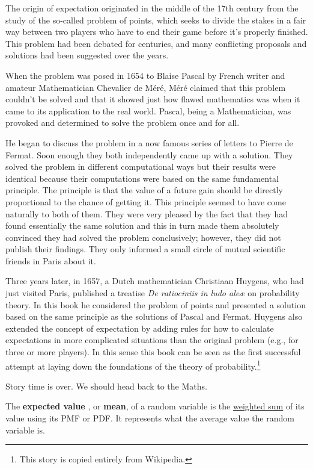 \documentclass[11pt, a4paper, oneside]{book}
\theoremstyle{definition}
\begin{document}
\noindent The origin of expectation originated in the middle of the 17th century from the study of the so-called problem of points, which seeks to divide the stakes in a fair way between two players who have to end their game before it's properly finished. This problem had been debated for centuries, and many conflicting proposals and solutions had been suggested over the years.

\noindent When the problem was posed in 1654 to Blaise Pascal by French writer and amateur Mathematician Chevalier de Méré, Méré claimed that this problem couldn't be solved and that it showed just how flawed mathematics was when it came to its application to the real world. Pascal, being a Mathematician, was provoked and determined to solve the problem once and for all. 

\noindent He began to discuss the problem in a now famous series of letters to Pierre de Fermat. Soon enough they both independently came up with a solution. They solved the problem in different computational ways but their results were identical because their computations were based on the same fundamental principle. The principle is that the value of a future gain should be directly proportional to the chance of getting it. This principle seemed to have come naturally to both of them. They were very pleased by the fact that they had found essentially the same solution and this in turn made them absolutely convinced they had solved the problem conclusively; however, they did not publish their findings. They only informed a small circle of mutual scientific friends in Paris about it.

\noindent Three years later, in 1657, a Dutch mathematician Christiaan Huygens, who had just visited Paris, published a treatise \emph{De ratiociniis in ludo aleæ} on probability theory. In this book he considered the problem of points and presented a solution based on the same principle as the solutions of Pascal and Fermat. Huygens also extended the concept of expectation by adding rules for how to calculate expectations in more complicated situations than the original problem (e.g., for three or more players). In this sense this book can be seen as the first successful attempt at laying down the foundations of the theory of probability.\footnote{This story is copied entirely from Wikipedia.}

\noindent Story time is over. We should head back to the Maths. 

\noindent The \textbf{expected value} , or \textbf{mean}, of a random variable is the \underline{weighted sum} of its value using its PMF or PDF. It represents what the average value the random variable is. 
\end{document}

